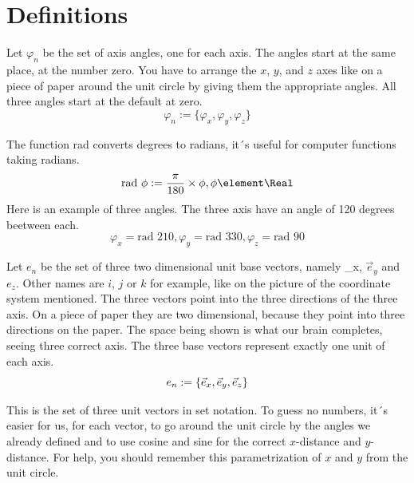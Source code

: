 \documentclass{article}
\begin{document}
\section{Definitions}

 Let $\varphi_n$ be the set of axis angles, one for each axis. The angles start
at the same place, at the number zero. You have to arrange the $x$, $y$, and
$z$ axes like on a piece of paper around the unit circle by giving them the
appropriate angles. All three angles start at the default at zero.\\

\begin{displaymath}
\varphi_n := \{\varphi_x, \varphi_y, \varphi_z\}
\end{displaymath}

\begin{example}
The function rad converts degrees to radians, it´s useful for computer functions taking radians.
\begin{displaymath}
\text{rad } \phi := \frac{\pi}{180} \times \phi, \phi \element \Real
\end{displaymath}
Here is an example of three angles. The three axis have an angle of 120 degrees beetween each.
\begin{displaymath}
\varphi_x = \text{rad 210} ,
\varphi_y = \text{rad 330} ,
\varphi_z = \text{rad 90} 
\end{displaymath}
\end{example}

 Let $e_n$ be the set of three two dimensional unit base vectors, namely 
_x, $\vec{e}_y$ and $e_z$. Other names are $i$, $j$ or $k$ for example, like on the
picture of the coordinate system mentioned. The three vectors point into the three directions
of the three axis. On a piece of paper they are two dimensional, because they point into three
directions on the paper. The space being shown is what our brain completes, seeing three correct
axis. The three base vectors represent exactly one unit of each axis. \\

\begin{displaymath}
e_n := \{\vec{e}_x, \vec{e}_y, \vec{e}_z\}\\
\end{displaymath} 
 
This is the set of three unit vectors in set notation. To guess no numbers, it´s easier for us, 
for each vector, to go around the unit circle by the angles we already defined and to use cosine 
and sine for the correct $x$-distance and $y$-distance. For help, you should remember this parametrization 
of $x$ and $y$ from the unit circle.\\
\end{document}
